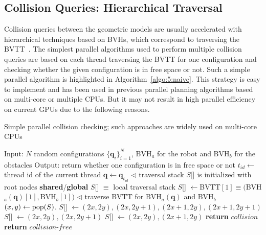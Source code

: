 \subsection{Collision Queries: Hierarchical Traversal}
Collision queries between the geometric models are usually accelerated with hierarchical techniques based on BVHs,
which correspond to traversing the BVTT~\cite{LGLM00}. The simplest parallel algorithms
used to perform multiple collision queries are based on each thread traversing the BVTT for one configuration and checking whether the given configuration is
in free space or not. Such a simple parallel algorithm is highlighted in Algorithm~\ref{algo:5:naive}. This
strategy is easy to implement and has been used in previous parallel planning algorithms based on multi-core or multiple CPUs.
But it may not result in high parallel efficiency on current GPUs due to the following reasons.
\begin{algorithm}[htb]
    \caption{Simple parallel collision checking; such approaches are widely used on multi-core CPUs}
    \label{algo:5:naive}
    \begin{algorithmic}[1]
    \STATE Input: $N$ random configurations $\{\mathbf{q}_i\}_{i=1}^N$, BVH$_a$ for the robot and BVH$_b$ for the obstacles
    \STATE Output: return whether one configuration is in free space or not
    \STATE $t_{id} \leftarrow $ thread id of the current thread
    \STATE $\mathbf{q} \leftarrow \mathbf{q}_{t_{id}}$
    \STATE $\lhd$ traversal stack $S$[] is initialized with root nodes
    \STATE \textbf{shared}/\textbf{global} $S$[] $\equiv$ local traversal stack
    \STATE $S$[] $\leftarrow $BVTT$[1] \equiv ($BVH$_a(\mathbf{q})[1],$BVH$_b[1])$
    \STATE $\lhd$ traverse BVTT for BVH$_a(\mathbf{q})$ and BVH$_b$
    \LOOP
    \STATE $(x,y) \leftarrow \operatorname{pop}(S)$.
            \STATE $S$[] $\leftarrow (2x,2y),(2x,2y+1),(2x+1,2y),(2x+1,2y+1)$
        \ENDIF
            \STATE $S$[] $\leftarrow (2x,2y),(2x,2y+1)$
        \ENDIF
            \STATE $S$[] $\leftarrow (2x,2y),(2x+1,2y)$
        \ENDIF
            \STATE \textbf{return} $collision$
        \ENDIF
    \ENDIF
    \ENDLOOP
    \STATE \textbf{return} $collision\text{-}free$
    \end{algorithmic}
\end{algorithm}
